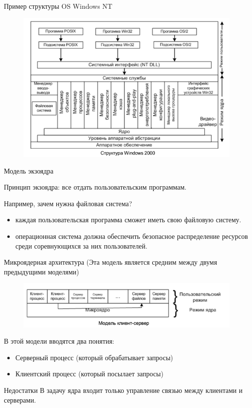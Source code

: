\documentclass{beamer}
\begin{document}
\begin{frame}[t]
Пример структуры OS Windows NT
\begin{figure}[h]
\centering
\includegraphics[scale=0.7]{images/lec01-pic05.png}
\end{figure}
\end{frame}

\begin{frame}[t]
Модель экзоядра

Принцип экзоядра: все отдать пользовательским программам. 

Например, зачем нужна файловая система? 
\begin{itemize}
\item каждая пользовательская программа сможет иметь свою файловую систему.
\item операционная система должна обеспечить безопасное распределение ресурсов среди соревнующихся за них пользователей.
\end{itemize}
\end{frame}

\begin{frame}[t]
Микроядерная архитектура (Эта модель является средним между двумя предыдущими моделями)
\begin{figure}[h]
\centering
\includegraphics[scale=0.75]{images/lec01-pic06.png}
\end{figure}
В этой модели вводятся два понятия:
\begin{itemize}
\item Серверный процесс (который обрабатывает запросы)
\item Клиентский процесс (который посылает запросы)
\end{itemize}
Недостатки 
В задачу ядра входит только управление связью между клиентами и серверами.
\end{frame}
\end{document}
